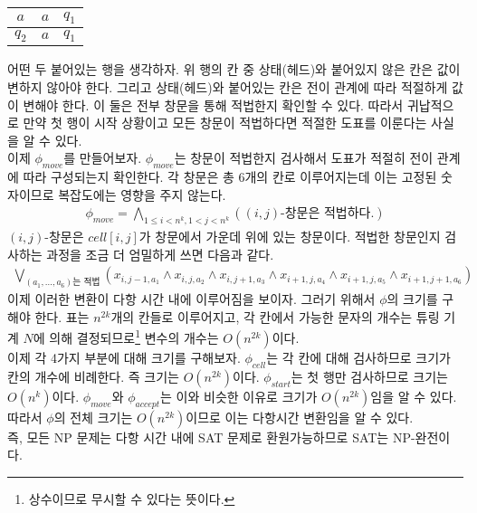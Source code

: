 \documentclass[b5paper, 11pt]{book}
\theoremstyle{definition}
\newenvironment{pf*}{\pushQED{\qed}\pf}
{\popQED\endpf}
\begin{document}
\begin{pf*}
\begin{table}[!ht]
\begin{subtable}[h]{0.3\textwidth}
\begin{tabular}{ | c | c | c|}
            \hline 
            $a$ & $a$ & $q_1$ \\ 
            \hline 
            $q_2$ & $a$ & $q_1$ \\ 
            \hline
           \end{tabular}
           \caption{}
        \end{subtable}
         \caption{}
         \label{illegal_window}
    \end{table}
    어떤 두 붙어있는 행을 생각하자. 위 행의 칸 중 상태(헤드)와 붙어있지 않은 칸은 값이 변하지 않아야 한다. 그리고 상태(헤드)와 붙어있는 칸은 전이 관계에 따라 적절하게 값이 변해야 한다. 이 둘은 전부 창문을 통해 적법한지 확인할 수 있다. 따라서 귀납적으로 만약 첫 행이 시작 상황이고 모든 창문이 적법하다면 적절한 도표를 이룬다는 사실을 알 수 있다.\\
    이제 $\phi_{move}$를 만들어보자. $\phi_{move}$는 창문이 적법한지 검사해서 도표가 적절히 전이 관계에 따라 구성되는지 확인한다. 각 창문은 총 6개의 칸로 이루어지는데 이는 고정된 숫자이므로 복잡도에는 영향을 주지 않는다. 
    \begin{align*}
        \phi_{move} = \bigwedge_{1 \le i < n^k, 1<j<n^k} ((i,j)\text{-창문은 적법하다.})
    \end{align*}
    $(i,j)$-창문은 $cell[i,j]$가 창문에서 가운데 위에 있는 창문이다. 적법한 창문인지 검사하는 과정을 조금 더 엄밀하게 쓰면 다음과 같다.
    \begin{align*}
        \bigvee_{(a_1, \ldots, a_6)\text{는 적법}} \left(
        x_{i,j-1,a_1} \wedge x_{i,j,a_2} \wedge x_{i, j+1, a_3} \wedge
        x_{i+1, j, a_4} \wedge x_{i+1, j, a_5} \wedge x_{i+1, j+1, a_6}
    \right)
    \end{align*}
    이제 이러한 변환이 다항 시간 내에 이루어짐을 보이자. 그러기 위해서 $\phi$의 크기를 구해야 한다. 표는 $n^{2k}$개의 칸들로 이루어지고, 각 칸에서 가능한 문자의 개수는 
    튜링 기계 $N$에 의해 결정되므로\footnote{상수이므로 무시할 수 있다는 뜻이다.} 변수의 개수는 $O(n^{2k})$이다. \\ 
    이제 각 4가지 부분에 대해 크기를 구해보자. $\phi_{cell}$는 각 칸에 대해 검사하므로 크기가 칸의 개수에 비례한다. 즉 크기는 $O(n^{2k})$이다. $\phi_{start}$는 첫 행만 검사하므로 크기는 $O(n^k)$이다. $\phi_{move}$와 $\phi_{accept}$는 이와 비슷한 이유로 크기가 $O(n^{2k})$임을 알 수 있다. 따라서 $\phi$의 전체 크기는 $O(n^{2k})$이므로 이는 다항시간 변환임을 알 수 있다.\\
    즉, 모든 NP 문제는 다항 시간 내에 SAT 문제로 환원가능하므로 SAT는 NP-완전이다.
\end{pf*}
\end{document}
